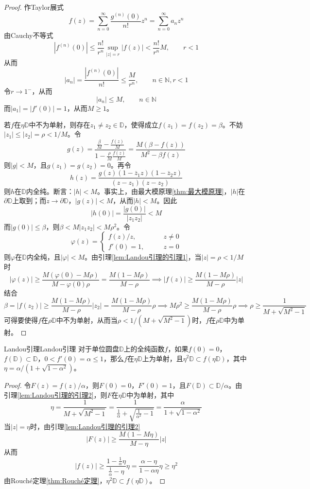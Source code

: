 \documentclass[lang = cn, scheme = chinese, thmcnt = section]{elegantbook}
\newcommand{\N}{\mathbb{N}}            %
\newcommand{\sub}{\subset}             %
\begin{document}
\begin{proof}
	作Taylor展式%
	$$
	f(z)=\sum_{n=0}^{\infty}\frac{g^{(n)}(0)}{n!}z^n=\sum_{n=0}^{\infty}a_nz^n
	$$
	由Cauchy不等式%
	$$
	|f^{(n)}(0)| \le \frac{n!}{r^n}\sup_{|z|=r}|f(z)|
	< \frac{n!}{r^n}M,\qquad r<1
	$$
	从而%
	$$
	|a_n|=\frac{|f^{(n)}(0)|}{n!}\le\frac{M}{r^n},\qquad n\in\N,r<1
	$$
	令$r\to 1^-$，从而%
	$$
	|a_n|\le M,\qquad n\in\N
	$$
	而$|a_1|=|f'(0)|=1$，从而$M\ge 1$。
	
	若$f$在$\eta\mathbb{D}$中不为单射，则存在$z_1\ne z_2\in\mathbb{D}$，使得成立$f(z_1)=f(z_2)=\beta$。不妨$|z_1|\le |z_2|=\rho<1/M$。令%
	$$
	g(z)=\frac{\frac{\beta}{M}-\frac{f(z)}{M}}{1-\frac{\rho}{M}\frac{f(z)}{M}}
	=\frac{M(\beta-f(z))}{M^2-\beta f(z)}
	$$
	则$|g|<M$，且$g(z_1)=g(z_2)=0$。再令%
	$$
	h(z)=\frac{g(z)(1-\overline{z}_1z)(1-\overline{z}_2z)}{(z-z_1)(z-z_2)}
	$$
	则$h$在$\mathbb{D}$内全纯。断言：$|h|<M$。事实上，由最大模原理\ref{thm:最大模原理}，$|h|$在$\partial\mathbb{D}$上取到；而$z\to\partial\mathbb{D}$，$|g(z)|<M$，从而$|h|<M$。因此
	$$
	|h(0)|=\frac{|g(0)|}{|z_1z_2|}<M
	$$
	而$|g(0)|\le \beta$，则$\beta<M|z_1z_2|<M\rho^2$。令%
	$$
	\varphi(z)=\begin{cases}
		f(z)/z,\qquad & z\ne 0\\
		f'(0)=1,\qquad & z=0
	\end{cases}
	$$
	则$\varphi$在$\mathbb{D}$内全纯，且$|\varphi|<M$。由引理\ref{lem:Landou引理的引理1}，当$|z|=\rho<1/M$时%
	$$
	|\varphi(z)|\ge\frac{M(\varphi(0)-M\rho)}{M-\varphi(0)\rho}
	=\frac{M(1-M\rho)}{M-\rho}\implies
	|f(z)|\ge\frac{M(1-M\rho)}{M-\rho}|z|
	$$
	结合%
	$$
	\beta=|f(z_2)|\ge\frac{M(1-M\rho)}{M-\rho}|z_2|
	=\frac{M(1-M\rho)}{M-\rho}\rho\implies
	M\rho^2\ge \frac{M(1-M\rho)}{M-\rho}\rho
	\implies
	\rho\ge\frac{1}{M+\sqrt{M^2-1}}
	$$
	可得要使得$f$在$\rho\mathbb{D}$中不为单射，从而当$\rho<1/(M+\sqrt{M^2-1})$时，$f$在$\rho\mathbb{D}$中为单射。
\end{proof}

\begin{theorem}{Landou引理}{Landou引理}
	对于单位圆盘$\mathbb{D}$上的全纯函数$f$，如果$f(0)=0$，$f(\mathbb{D})\sub\mathbb{D}$，$0<f'(0)=\alpha\le 1$，那么$f$在$\eta\mathbb{D}$上为单射，且$\eta^2\mathbb{D}\sub f\left(\eta\mathbb{D}\right)$，其中$\eta=\alpha/(1+\sqrt{1-\alpha^2})$。
\end{theorem}

\begin{proof}
	令$F(z)=f(z)/\alpha$，则$F(0)=0$，$F'(0)=1$，且$F(\mathbb{D})\sub\mathbb{D}/\alpha$。由引理\ref{lem:Landou引理的引理2}，则$F$在$\eta\mathbb{D}$中为单射，其中%
	$$
	\eta=\frac{1}{M+\sqrt{M^2-1}}
	=\frac{1}{\frac{1}{\alpha}+\sqrt{\frac{1}{\alpha^2}-1}}
	=\frac{\alpha}{1+\sqrt{1-\alpha^2}}
	$$
	当$|z|=\eta$时，由引理\ref{lem:Landou引理的引理2}%
	$$
	|F(z)|\ge\frac{M(1-M\eta)}{M-\eta}|z|
	$$
	从而%
	$$
	|f(z)|\ge\frac{1-\frac{1}{\alpha}\eta}{\frac{1}{\alpha}-\eta}\eta=\frac{\alpha-\eta}{1-\alpha\eta}\eta\ge\eta^2
	$$
	由Rouché定理\ref{thm:Rouché定理}，$\eta^2\mathbb{D}\sub f\left(\eta\mathbb{D}\right)$。
\end{proof}
\end{document}
